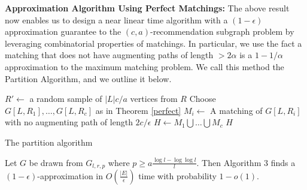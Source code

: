 %

{\bf Approximation Algorithm Using Perfect Matchings:}
The above result now enables us to design a near linear time
algorithm with a $(1-\epsilon)$ approximation guarantee
to the $(c,a)$-recommendation subgraph problem by leveraging
combinatorial properties of matchings. In particular, we use
the fact a matching that does not have augmenting paths of
length $>2\alpha$ is a $1-1/\alpha$ approximation to the maximum
matching problem. We call this method the Partition Algorithm,
and we outline it below.

\begin{algorithm}[h]\label{partition_alg}
  \SetAlgoLined
  $R' \leftarrow$ a random sample of $|L|c/a$ vertices from $R$\;
  Choose $G[L,R_1],\ldots,G[L,R_c]$ as in Theorem \ref{perfect}\;
   {
    $M_i \leftarrow$ A matching of $G[L,R_i]$ with no augmenting path of length $2c/\epsilon$\;
  }
  $H \leftarrow M_1\bigcup\ldots \bigcup M_c$\;
  \Return $H$\;
  \caption{The partition algorithm}
\end{algorithm}
\vspace{-.2cm}

\begin{thm}
Let $G$ be drawn from $G_{l,r,p}$ where $p \geq a\frac{\log l - \log\log l}{l}$.
Then Algorithm 3 finds a $(1-\epsilon)$-approximation
in $O(\frac{|E|}{\epsilon})$ time with probability $1-o(1)$.
\end{thm}

